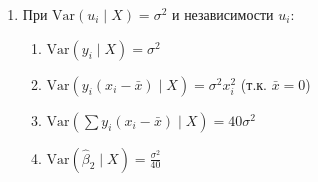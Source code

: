 \documentclass[12pt]{article}
\begin{document}
\begin{problem}
\begin{sol}
\begin{enumerate}
\item При $\text{Var}(u_i \mid X) = \sigma^2$ и независимости $u_i$:

\begin{enumerate}
\item $\text{Var}(y_i \mid X) = \sigma^2$
\item $\text{Var}(y_i (x_i - \bar{x}) \mid X) = \sigma^2 x_i^2$ (т.к. $\bar{x}=0$)
\item $\text{Var}\left(\sum y_i (x_i - \bar{x}) \mid X\right) = 40\sigma^2$
\item $\text{Var}(\hat{\beta}_2 \mid X) = \frac{\sigma^2}{40}$
\end{enumerate}

\end{enumerate}
  \end{sol}
\end{problem}
\end{document}
